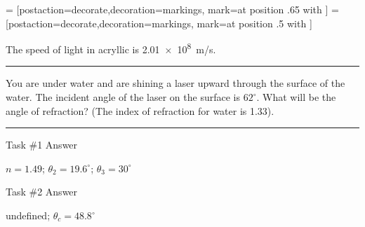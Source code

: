 \documentclass[12pt]{exam}
\begin{document}
\Large

  =
    [postaction={decorate,decoration={markings,
    mark=at position .65 with {}}}]
  =
    [postaction={decorate,decoration={markings,
    mark=at position .5 with {}}}]


\begin{questions}


\question
  The speed of light in acryllic is \SI{2.01e8}{m/s}. 
  

  \vspace{2em}





\vs \hrule \vs

\question
  You are under water and are shining a laser upward through the surface of the water.  The incident angle of the laser on the surface is $62^\circ$.  What will be the angle of refraction? (The index of refraction for water is 1.33).

\end{questions}
 
\vs \hrule \vs

Task \#1 Answer

$n=1.49$; $\theta_2=19.6^\circ$; $\theta_3=30^\circ$


\vspace{1em}

Task \#2 Answer

undefined; $\theta_c=48.8^\circ$
\end{document}
